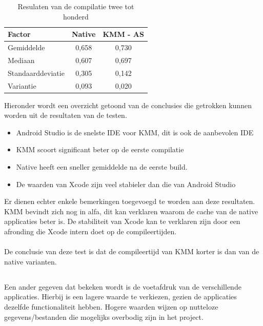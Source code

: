 \begin{table}[H]
    \centering
    \caption{Resulaten van de compilatie twee tot honderd}
    \begin{tabular}{|l|c|c|}
        \hline
        {\textbf{Factor}} & {\textbf{Native}}  & {\textbf{KMM - AS}}\\ \hline \hline
        Gemiddelde&0,658&0,730\\ \hline
        Mediaan&0,607&0,697\\ \hline
        Standaarddeviatie&0,305&0,142\\ \hline
        Variantie&0,093&0,020\\ \hline
    \end{tabular}
    \label{T:compileer-andere-overzicht}
\end{table}

Hieronder wordt een overzicht getoond van de conclusies die getrokken kunnen worden uit de resultaten van de testen.
\begin{itemize}
    \item Android Studio is de snelste IDE voor KMM, dit is ook de aanbevolen IDE
    \item KMM scoort significant beter op de eerste compilatie
    \item Native heeft een sneller gemiddelde na de eerste build.
    \item De waarden van Xcode zijn veel stabieler dan die van Android Studio
\end{itemize}
Er dienen echter enkele bemerkingen toegevoegd te worden aan deze resultaten. KMM bevindt zich nog in alfa, dit kan verklaren waarom de cache van de native applicaties beter is. De stabiliteit van Xcode kan te verklaren zijn door een afronding die Xcode intern doet op de compileertijden.
\\ \\ 
De conclusie van deze test is dat de compileertijd van KMM korter is dan van de native varianten. 


\subsection{}
\label{sec:M-test-voetafdruk}
Een ander gegeven dat bekeken wordt is de voetafdruk van de verschillende applicaties. Hierbij is een lagere waarde te verkiezen,  gezien de applicaties dezelfde functionaliteit hebben. Hogere waarden wijzen op nutteloze gegevens/bestanden die mogelijks overbodig zijn in het project.


